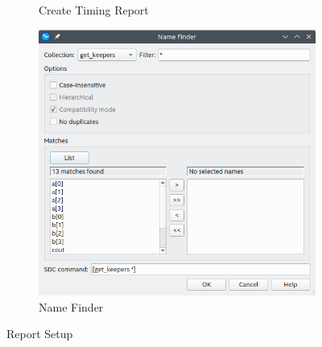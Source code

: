 \documentclass[12pt]{betterjournal}
\begin{document}
\begin{minipage}[htbp!]{\linewidth}
\begin{minipage}[ht!]{0.5\linewidth}
\begin{figure}[H]
\begin{subfigure}{\linewidth}
        \caption{Create Timing Report}
        \label{fig:timingreportconfig}
    \end{subfigure}
    \vspace{2mm}
    \begin{subfigure}{\linewidth}
        \includegraphics[width=\linewidth]{nameselection.png}
        \caption{Name Finder}
        \label{fig:namefinder}
    \end{subfigure}
    \caption{Report Setup}
    \end{figure}
    \end{minipage}
\end{minipage}%
\hspace{-0.46\textwidth}
\end{document}

